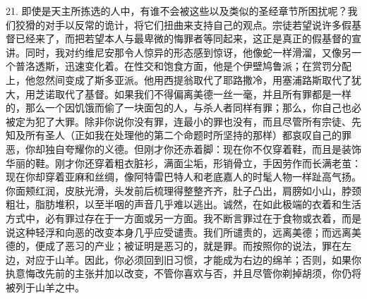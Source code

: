 21. 即使是天主所拣选的人中，有谁不会被这些以及类似的圣经章节所困扰呢？我们狡猾的对手以反常的诡计，将它们扭曲来支持自己的观点。宗徒若望说许多假基督已经来了，而把若望本人与最卑微的悔罪者等同起来，这正是真正的假基督的宣讲。同时，我对约维尼安那令人惊异的形态感到惊讶，他像蛇一样滑溜，又像另一个普洛透斯，迅速变化着。在性交和饱食方面，他是个伊壁鸠鲁派；在赏罚分配上，他忽然间变成了斯多亚派。他用西提翁取代了耶路撒冷，用塞浦路斯取代了犹大，用芝诺取代了基督。如果我们不得偏离美德一丝一毫，并且所有罪都是一样的，那么一个因饥饿而偷了一块面包的人，与杀人者同样有罪；那么，你自己也必被定为犯了大罪。除非你说你没有罪，连最小的罪也没有，而且尽管所有宗徒、先知及所有圣人（正如我在处理他的第二个命题时所坚持的那样）都哀叹自己的罪恶，你却独自夸耀你的义德。但刚才你还赤着脚：现在你不仅穿着鞋，而且是装饰华丽的鞋。刚才你还穿着粗衣脏衫，满面尘垢，形销骨立，手因劳作而长满老茧：现在你却穿着亚麻和丝绸，像阿特雷巴特人和老底嘉人的时髦人物一样趾高气扬。你面颊红润，皮肤光滑，头发前后梳理得整整齐齐，肚子凸出，肩膀如小山，脖颈粗壮，脂肪堆积，以至半咽的声音几乎难以逃出。诚然，在如此极端的衣着和生活方式中，必有罪过存在于一方面或另一方面。我不断言罪过在于食物或衣着，而是说这种轻浮和向恶的改变本身几乎应受谴责。我们所谴责的，远离美德；而远离美德的，便成了恶习的产业；被证明是恶习的，就是罪。而按照你的说法，罪在左边，对应于山羊。因此，你必须回到旧习惯，才能成为右边的绵羊；否则，如果你执意悔改先前的主张并加以改变，不管你喜欢与否，并且尽管你剃掉胡须，你仍将被列于山羊之中。\par

